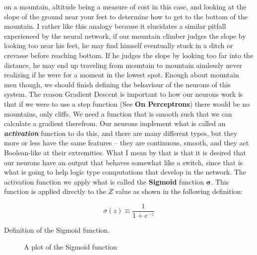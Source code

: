 \documentclass[a4paper,10pt]{article}
\let\oldemph\emph
\renewcommand{\emph}[1]{\textbf{\oldemph{#1}}}
\newcommand{\mathwords}[1]{
	{
		\linespread{.95}
		\begin{adjustwidth}{8em}{8em}
			\footnotesize
			#1 
		\end{adjustwidth}
	}
}
\begin{document}
on a mountain, altitude being a measure of cost in this case, and looking at the slope of the ground near your feet to determine how to
get to the bottom of the mountain.  I rather like this analogy because it elucidates a similar pitfall experienced by
the neural network, if our mountain climber judges the slope by looking too near his feet, he may find himself eventually
stuck in a ditch or crevasse before reaching bottom.  If he judges the slope by looking too far into the distance, he
may end up traveling from mountain to mountain aimlessly never realizing if he were for a moment in the lowest spot. 
Enough about mountain men though, we should finish defining the behaviour of the neurons of this system.  The reason
Gradient Descent is important to how our neurons work is that if we were to use a step function (See \textbf{On Perceptrons})
there would be no mountains, only cliffs.  We need a function that is smooth such that we can calculate a gradient
therefrom.  Our neurons implement what is called an \emph{activation} function to do this, and there are many different
types, but they more or less have the same features -- they are continuous, smooth, and they act Boolean-like at their
extremities. What I mean by that is that it is desired that our neurons have an output that behaves somewhat like a
switch, since that is what is going to help logic type computations that develop in the network.  The activation
function we apply what is called the \textbf{Sigmoid} function $\boldsymbol\sigma$.  This function is applied directly
to the $Z$ value as shown in the following definition:
\setlength{\parskip}{0.7em}

\begin{equation}\label{Sigmafunc}
\sigma(z) \equiv \frac{1}{1+e^{-z}} 
\end{equation} 

\mathwords{\centering Definition of the Sigmoid function.}



\begin{figure}[H]
\centering
	
	\caption{A plot of the Sigmoid function}
	\label{fig:SigPlot}
\end{figure}
\end{document}
